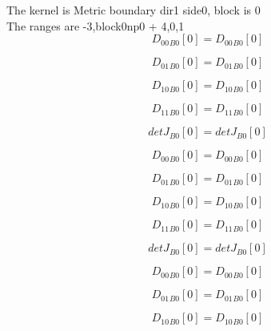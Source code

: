 \documentclass{article}
\begin{document}
\noindent The kernel is Metric boundary dir1 side0, block is 0\\\noindent The ranges are -3,block0np0 + 4,0,1\\\begin{dmath}{D_{00}{_{B0}}}[{0}] = {D_{00}{_{B0}}}[{0}]\end{dmath}

\begin{dmath}{D_{01}{_{B0}}}[{0}] = {D_{01}{_{B0}}}[{0}]\end{dmath}

\begin{dmath}{D_{10}{_{B0}}}[{0}] = {D_{10}{_{B0}}}[{0}]\end{dmath}

\begin{dmath}{D_{11}{_{B0}}}[{0}] = {D_{11}{_{B0}}}[{0}]\end{dmath}

\begin{dmath}{detJ{_{B0}}}[{0}] = {detJ{_{B0}}}[{0}]\end{dmath}

\begin{dmath}{D_{00}{_{B0}}}[{0}] = {D_{00}{_{B0}}}[{0}]\end{dmath}

\begin{dmath}{D_{01}{_{B0}}}[{0}] = {D_{01}{_{B0}}}[{0}]\end{dmath}

\begin{dmath}{D_{10}{_{B0}}}[{0}] = {D_{10}{_{B0}}}[{0}]\end{dmath}

\begin{dmath}{D_{11}{_{B0}}}[{0}] = {D_{11}{_{B0}}}[{0}]\end{dmath}

\begin{dmath}{detJ{_{B0}}}[{0}] = {detJ{_{B0}}}[{0}]\end{dmath}

\begin{dmath}{D_{00}{_{B0}}}[{0}] = {D_{00}{_{B0}}}[{0}]\end{dmath}

\begin{dmath}{D_{01}{_{B0}}}[{0}] = {D_{01}{_{B0}}}[{0}]\end{dmath}

\begin{dmath}{D_{10}{_{B0}}}[{0}] = {D_{10}{_{B0}}}[{0}]\end{dmath}
\end{document}

